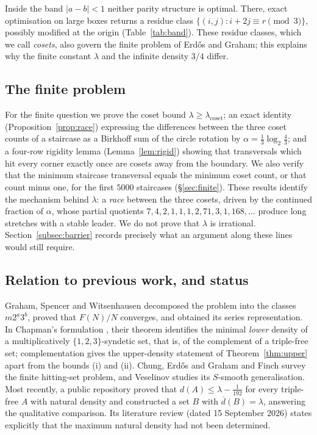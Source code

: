 \documentclass[11pt]{amsart}
\theoremstyle{definition}
\newcommand{\dup}{\overline{d}}
\newcommand{\lamc}{\lambda_{\mathrm{coset}}}
\begin{document}
Inside the band $|a-b|<1$ neither parity structure is optimal. There, exact optimisation on large boxes returns a residue class $\{(i,j):i+2j\equiv r\pmod 3\}$, possibly modified at the origin (Table~\ref{tab:band}). These residue classes, which we call \emph{cosets}, also govern the finite problem of Erd\H{o}s and Graham; this explains why the finite constant $\lambda$ and the infinite density $3/4$ differ.

\subsection{The finite problem}
For the finite question we prove the coset bound $\lambda\ge\lamc$; an exact identity (Proposition~\ref{prop:race}) expressing the differences between the three coset counts of a staircase as a Birkhoff sum of the circle rotation by $\alpha=\frac13\log_2\frac43$; and a four-row rigidity lemma (Lemma~\ref{lem:rigid}) showing that transversals which hit every corner exactly once are cosets away from the boundary. We also verify that the minimum staircase transversal equals the minimum coset count, or that count minus one, for the first $5000$ staircases (\S\ref{sec:finite}). These results identify the mechanism behind $\lambda$: a \emph{race} between the three cosets, driven by the continued fraction of $\alpha$, whose partial quotients $7,4,2,1,1,1,2,71,3,1,168,\dots$ produce long stretches with a stable leader. We do not prove that $\lambda$ is irrational. Section~\ref{subsec:barrier} records precisely what an argument along these lines would still require.

\subsection{Relation to previous work, and status}
Graham, Spencer and Witsenhausen \cite{GSW77} decomposed the problem into the classes $m2^a3^b$, proved that $F(N)/N$ converges, and obtained its series representation. In Chapman's formulation \cite[Thm.~3.2]{Chapman}, their theorem identifies the minimal \emph{lower} density of a multiplicatively $\{1,2,3\}$-syndetic set, that is, of the complement of a triple-free set; complementation gives the upper-density statement of Theorem~\ref{thm:upper} apart from the bounds (i) and (ii). Chung, Erd\H{o}s and Graham \cite{CEG02} and Finch \cite{Finch} survey the finite hitting-set problem, and Veselinov \cite{Ves26} studies its $S$-smooth generalisation. Most recently, a public repository \cite{Coleski} proved that $d(A)\le\lambda-\tfrac1{192}$ for every triple-free $A$ with natural density and constructed a set $B$ with $\dup(B)=\lambda$, answering the qualitative comparison. Its literature review (dated 15 September 2026) states explicitly that the maximum natural density had not been determined.
\end{document}
